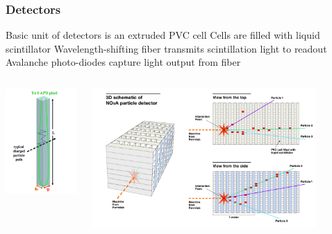 \documentclass[10pt,professionalfonts,xcolor=table]{beamer}
\begin{document}
\frame
{
\frametitle{\nova Detectors}

\bangon
\bang Basic unit of \nova detectors is an extruded PVC cell
\bang Cells are filled with liquid scintillator
\bang Wavelength-shifting fiber transmits scintillation light to readout
\bang Avalanche photo-diodes capture light output from fiber
\bangoff

\begin{columns}[c]
 \includegraphics[width=1.4\textwidth]{figures/figures/cell.png}
~

\centering
 \includegraphics[width=0.85\textwidth]{figures/figures/schematic.jpg}


\end{columns}}
\end{document}
